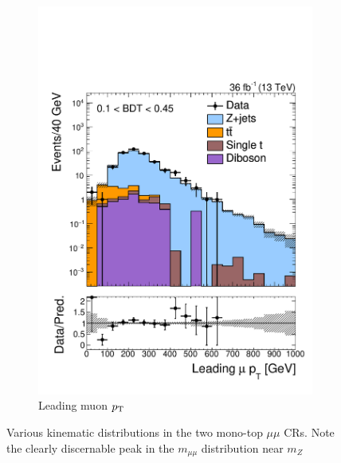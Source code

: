 \begin{figure}[]
\begin{center}
\begin{subfigure}[t]{0.49\textwidth}
            \includegraphics[width=\textwidth]{figures/monotop/prefit/dimuon_loose_looseLep1Pt_logy.pdf}
            \caption{Leading muon $p_\mathrm{T}$}
        \end{subfigure}
        \caption{Various kinematic distributions in the two mono-top $\mu\mu$ CRs.
                Note the clearly discernable peak in the $m_{\mu\mu}$ distribution near $m_Z$}
        \label{fig:mt:prefit_dimuon}
    \end{center}
\end{figure}

